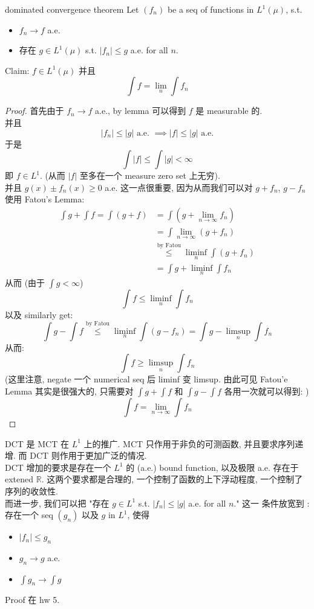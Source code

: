 \documentclass[lang=cn,11pt]{elegantbook}
\begin{document}
\begin{theorem}{dominated convergence theorem}
    \label{DCT}
    Let $(f_n)$ be a seq of functions in $L^1(\mu)$, s.t. \begin{itemize}
        \item $f_n \rightarrow f $ a.e.
        \item 存在 $g \in L^1(\mu)$ s.t. $|f_n| \leq g $ a.e. for all $n$. 
    \end{itemize}
    Claim: $f \in L^1(\mu)$ 并且 \[
    \int f = \lim_n \int f_n
    \]
\end{theorem}
\begin{proof}
    首先由于 $f_n \to f$ a.e.,  by lemma 可以得到 $f$ 是 measurable 的.\\
    并且 $$|f_n| \leq |g| \text{ a.e. } \implies  |f| \leq |g| \text{ 
a.e.}$$ 于是 \[\int |f| \leq \int |g| < \infty \] 即 $f \in L^1$. (从而 $|f|$ 至多在一个 measure zero set 上无穷).\\
并且 $ g(x) \pm f_n(x) \geq 0 $ a.e. 这一点很重要, 因为从而我们可以对 $g+f_n$, $g-f_n$ 使用 Fatou's Lemma: 
\begin{align}
    \int g + \int f = \int (g+f) &= \int (g + \lim_{n\to\infty} f_n) \\
    &= \int \lim_{n\to\infty} (g+f_n) \\
    &  \overset{\text{by Fatou}}{\leq }  \liminf_n \int (g+f_n) \\
    &= \int g + \liminf_n \int f_n
\end{align}从而 (由于 $\int g < \infty$)\[
\int f \leq \liminf_n \int f_n
\]
以及 similarly get: \[
\int g - \int f \overset{\text{by Fatou}}{\leq } \liminf_n \int (g-f_n) = \int g - \limsup_n \int f_n
\]
从而: \[
\int f  \geq \limsup_n \int f_n
\]
(这里注意, negate 一个 numerical seq 后 liminf 变 limsup. 由此可见 Fatou'e Lemma 其实是很强大的, 只需要对 $\int g + \int f$ 和 $\int  g - \int f$ 各用一次就可以得到: )\[
\int f = \lim_{n\to \infty } \int f_n
\]
\end{proof}

\begin{remark}
DCT 是 MCT 在 $L^1$ 上的推广. MCT 只作用于非负的可测函数, 并且要求序列递增. 而 DCT 则作用于更加广泛的情况.\\

DCT 增加的要求是存在一个 $L^1$ 的 (a.e.) bound function, 以及极限 a.e. 存在于 extened $\mathbb{R}$. 这两个要求都是合理的, 一个控制了函数的上下浮动程度, 一个控制了序列的收敛性.\\

而进一步, 我们可以把 "存在 $g \in L^1$ s.t. $|f_n| \leq |g| $ a.e. for all $n$." 这一 条件放宽到 : 存在一个 seq $(g_n)$ 以及 $g$ in $L^1$, 使得 \begin{itemize}
        \item $|f_n| \leq g_n$
        \item  $g_n \to g$ a.e.
        \item $\int g_n \to \int g$
    \end{itemize}
Proof 在 hw 5.
\end{remark}
\end{document}
